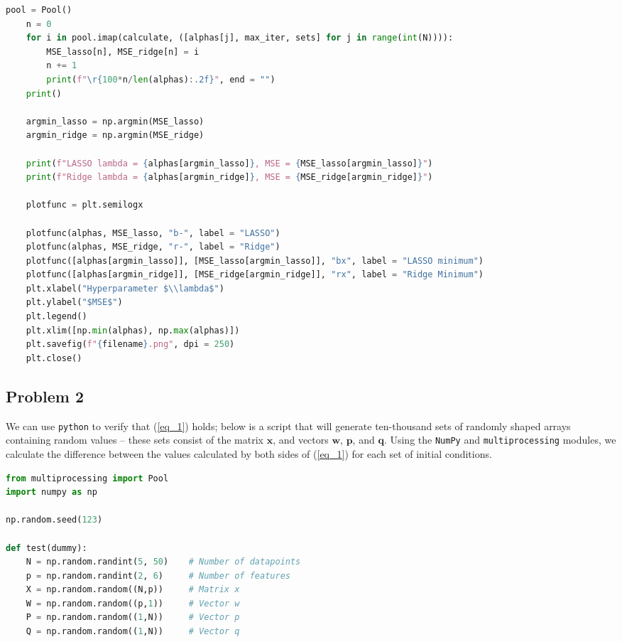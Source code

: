 \documentclass[a4paper,10pt,english]{article}
\begin{document}
\begin{multicols*}{2}
\begin{lstlisting}[showstringspaces=false,language=Python,numbers=none]
    pool = Pool()
    n = 0
    for i in pool.imap(calculate, ([alphas[j], max_iter, sets] for j in range(int(N)))):
        MSE_lasso[n], MSE_ridge[n] = i
        n += 1
        print(f"\r{100*n/len(alphas):.2f}", end = "")
    print()

    argmin_lasso = np.argmin(MSE_lasso)
    argmin_ridge = np.argmin(MSE_ridge)

    print(f"LASSO lambda = {alphas[argmin_lasso]}, MSE = {MSE_lasso[argmin_lasso]}")
    print(f"Ridge lambda = {alphas[argmin_ridge]}, MSE = {MSE_ridge[argmin_ridge]}")

    plotfunc = plt.semilogx

    plotfunc(alphas, MSE_lasso, "b-", label = "LASSO")
    plotfunc(alphas, MSE_ridge, "r-", label = "Ridge")
    plotfunc([alphas[argmin_lasso]], [MSE_lasso[argmin_lasso]], "bx", label = "LASSO minimum")
    plotfunc([alphas[argmin_ridge]], [MSE_ridge[argmin_ridge]], "rx", label = "Ridge Minimum")
    plt.xlabel("Hyperparameter $\\lambda$")
    plt.ylabel("$MSE$")
    plt.legend()
    plt.xlim([np.min(alphas), np.max(alphas)])
    plt.savefig(f"{filename}.png", dpi = 250)
    plt.close()
\end{lstlisting}

\subsection*{Problem 2}

We can use \texttt{python} to verify that (\ref{eq_1}) holds; below is a script that will generate ten-thousand sets of randomly shaped arrays containing random values – these sets consist of the matrix $\mathbf{x}$, and vectors $\mathbf{w}$, $\mathbf{p}$, and $\mathbf{q}$.  Using the \texttt{NumPy} and \texttt{multiprocessing} modules, we calculate the difference between the values calculated by both sides of (\ref{eq_1}) for each set of initial conditions.

\begin{lstlisting}[showstringspaces=false,language=Python,numbers=none]
from multiprocessing import Pool
import numpy as np

np.random.seed(123)

def test(dummy):
    N = np.random.randint(5, 50)    # Number of datapoints
    p = np.random.randint(2, 6)     # Number of features
    X = np.random.random((N,p))     # Matrix x
    W = np.random.random((p,1))     # Vector w
    P = np.random.random((1,N))     # Vector p
    Q = np.random.random((1,N))     # Vector q


\end{lstlisting}
\end{multicols*}
\end{document}
